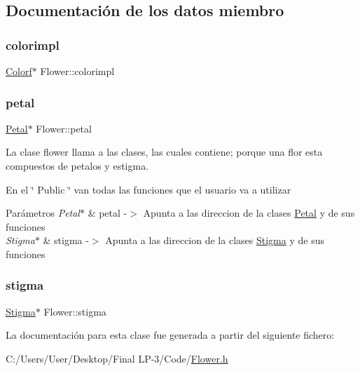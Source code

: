 \subsection{Documentación de los datos miembro}
\mbox{\label{class_flower_a4d27938dc8f29b7311a8a31093cb5ce4}} 
\subsubsection{\texorpdfstring{colorimpl}{colorimpl}}
{\footnotesize\ttfamily \mbox{\hyperlink{class_colorf}{Colorf}}$\ast$ Flower\+::colorimpl\hspace{0.3cm}{\ttfamily [protected]}}

\mbox{\label{class_flower_af0f1dc8c951cb056cf77409ca06d96f7}} 
\subsubsection{\texorpdfstring{petal}{petal}}
{\footnotesize\ttfamily \mbox{\hyperlink{class_petal}{Petal}}$\ast$ Flower\+::petal}



La clase flower llama a las clases, las cuales contiene; porque una flor esta compuestos de petalos y estigma. 

En el \char`\"{} Public \char`\"{} van todas las funciones que el usuario va a utilizar
\begin{DoxyParams}{Parámetros}
{\em Petal$\ast$} & petal -\/$>$ Apunta a las direccion de la clases \mbox{\hyperlink{class_petal}{Petal}} y de sus funciones \\
\hline
{\em Stigma$\ast$} & stigma -\/$>$ Apunta a las direccion de la clases \mbox{\hyperlink{class_stigma}{Stigma}} y de sus funciones \\
\hline
\end{DoxyParams}
\mbox{\label{class_flower_a691f3890594faacb64c9cea88be1c8d0}} 
\subsubsection{\texorpdfstring{stigma}{stigma}}
{\footnotesize\ttfamily \mbox{\hyperlink{class_stigma}{Stigma}}$\ast$ Flower\+::stigma}



La documentación para esta clase fue generada a partir del siguiente fichero\+:\begin{DoxyCompactItemize}
\item 
C\+:/\+Users/\+User/\+Desktop/\+Final L\+P-\/3/\+Code/\mbox{\hyperlink{_flower_8h}{Flower.\+h}}\end{DoxyCompactItemize}
